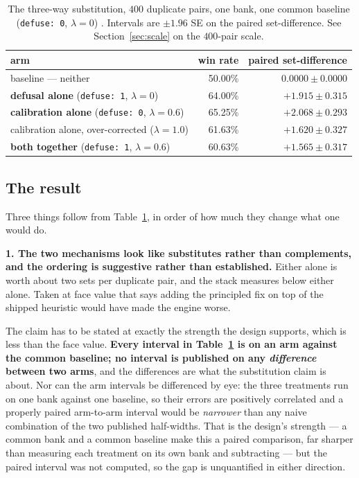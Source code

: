 \documentclass[11pt]{article}
\newcommand{\code}[1]{\texttt{#1}}
\begin{document}
\begin{table}[ht]
\centering
\caption{The three-way substitution, $400$ duplicate pairs, one bank, one common baseline
(\mbox{\code{defuse: 0}}, $\lambda = 0$) \cite{asking}. Intervals are $\pm 1.96$ SE on the paired
set-difference. See Section~\ref{sec:scale} on the $400$-pair scale.}
\label{tab:substitution}
\small
\begin{tabular}{@{}lrr@{}}
\toprule
arm & win rate & paired set-difference \\
\midrule
baseline --- neither & 50.00\% & $0.0000 \pm 0.0000$ \\
\textbf{defusal alone} (\mbox{\code{defuse: 1}}, $\lambda = 0$) & 64.00\%
  & $\mathbf{+1.915 \pm 0.315}$ \\
\textbf{calibration alone} (\mbox{\code{defuse: 0}}, $\lambda = 0.6$) & 65.25\%
  & $\mathbf{+2.068 \pm 0.293}$ \\
calibration alone, over-corrected ($\lambda = 1.0$) & 61.63\% & $+1.620 \pm 0.327$ \\
\textbf{both together} (\mbox{\code{defuse: 1}}, $\lambda = 0.6$) & 60.63\%
  & $\mathbf{+1.565 \pm 0.317}$ \\
\bottomrule
\end{tabular}
\end{table}

\subsection{The result}
\label{sec:subresult}

Three things follow from Table~\ref{tab:substitution}, in order of how much they change
what one would do.

\textbf{1. The two mechanisms look like substitutes rather than complements, and the
ordering is suggestive rather than established.} Either alone is worth about two sets per
duplicate pair, and the stack measures below either alone. Taken at face value that says
adding the principled fix on top of the shipped heuristic would have made the engine
worse.

The claim has to be stated at exactly the strength the design supports, which is less than
the face value. \textbf{Every interval in Table~\ref{tab:substitution} is on an arm
against the common baseline; no interval is published on any \emph{difference} between two
arms}, and the differences are what the substitution claim is about. Nor can the arm
intervals be differenced by eye: the three treatments run on one bank against one
baseline, so their errors are positively correlated and a properly paired arm-to-arm
interval would be \emph{narrower} than any naive combination of the two published
half-widths. That is the design's strength --- a common bank and a common baseline make
this a paired comparison, far sharper than measuring each treatment on its own bank and
subtracting --- but the paired interval was not computed, so the gap is unquantified in
either direction.
\end{document}
